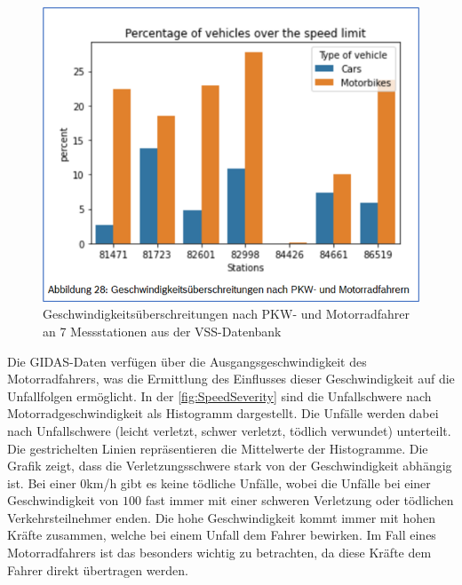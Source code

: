 \begin{figure}[H]
	\centering
	\includegraphics[width=\linewidth]{Bilder/GeschwUberschreitungPksMotorrad.png}
	\caption{Geschwindigkeitsüberschreitungen nach PKW- und Motorradfahrer an 7 Messstationen aus der VSS-Datenbank \cite{Maire2020}}
	\label{fig:GeschwUberschreitungPksMotorrad}
\end{figure}
Die GIDAS-Daten verfügen über die Ausgangsgeschwindigkeit des Motorradfahrers, was die Ermittlung des Einflusses dieser Geschwindigkeit auf die Unfallfolgen ermöglicht. In der \autoref{fig:SpeedSeverity} sind die Unfallschwere nach Motorradgeschwindigkeit als Histogramm dargestellt. Die Unfälle werden dabei nach Unfallschwere (leicht verletzt, schwer verletzt, tödlich verwundet) unterteilt. Die gestrichelten Linien repräsentieren die Mittelwerte der Histogramme.
Die Grafik zeigt, dass die Verletzungsschwere stark von der Geschwindigkeit abhängig ist. Bei einer $0$km/h gibt es keine tödliche Unfälle, wobei die Unfälle bei einer Geschwindigkeit von $100$ fast immer mit einer schweren Verletzung oder tödlichen Verkehrsteilnehmer enden. Die hohe Geschwindigkeit kommt immer mit hohen Kräfte zusammen, welche bei einem Unfall dem Fahrer bewirken. Im Fall eines Motorradfahrers ist das besonders wichtig zu betrachten, da diese Kräfte dem Fahrer direkt übertragen werden. \cite{Maire2020}


